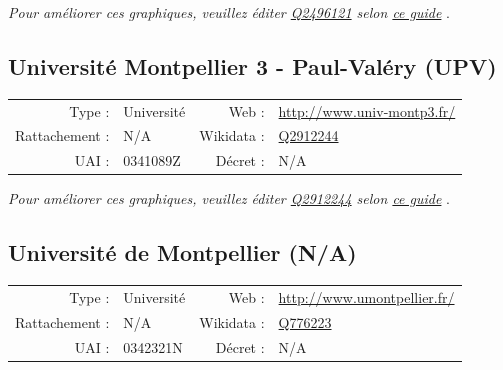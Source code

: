 \documentclass[11pt,french,landscape]{article}
\begin{document}
\textit{\scriptsize Pour améliorer ces graphiques, veuillez éditer \href{https://www.wikidata.org/entity/Q2496121}{Q2496121}  selon \href{https://github.com/cpesr/wikidataESR/blob/master/Rmd/wikidataESR.md}{ce guide}}
.


\newpage

\hypertarget{universituxe9-montpellier-3---paul-valuxe9ry-upv}{%
\subsection{Université Montpellier 3 - Paul-Valéry
(UPV)}\label{universituxe9-montpellier-3---paul-valuxe9ry-upv}}

\begin{tabular*}{0.45\textwidth}{rp{2cm}rl}  
\hline  
Type : & Université & Web : &\href{http://www.univ-montp3.fr/}{http://www.univ-montp3.fr/} \\  
Rattachement : & N/A & Wikidata : & \href{https://www.wikidata.org/entity/Q2912244}{Q2912244} \\  
UAI : & 0341089Z & Décret : & N/A \\  
\hline  
\end{tabular*}

\textit{\scriptsize Pour améliorer ces graphiques, veuillez éditer \href{https://www.wikidata.org/entity/Q2912244}{Q2912244}  selon \href{https://github.com/cpesr/wikidataESR/blob/master/Rmd/wikidataESR.md}{ce guide}}
.


\newpage

\hypertarget{universituxe9-de-montpellier-na}{%
\subsection{Université de Montpellier
(N/A)}\label{universituxe9-de-montpellier-na}}

\begin{tabular*}{0.45\textwidth}{rp{2cm}rl}  
\hline  
Type : & Université & Web : &\href{http://www.umontpellier.fr/}{http://www.umontpellier.fr/} \\  
Rattachement : & N/A & Wikidata : & \href{https://www.wikidata.org/entity/Q776223}{Q776223} \\  
UAI : & 0342321N & Décret : & N/A \\  
\hline  
\end{tabular*}
\end{document}
